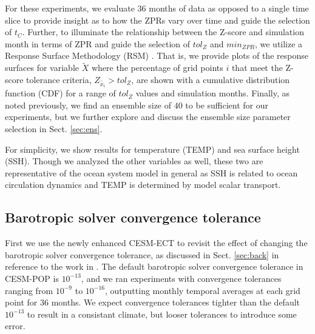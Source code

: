 \documentclass[gmd, manuscript]{copernicus}
\begin{document}
For these experiments, we evaluate 36 months of data as opposed to a single time slice to provide insight as to how the ZPRs vary over time and guide the selection of $t_C$.  Further, to illuminate the relationship between the Z-score and simulation month in terms of ZPR and guide the selection of $tol_{Z}$ and $min_{ZPR}$, we utilize a Response Surface Methodology (RSM) \citep[e.g.,][]{box2007}. That is, we provide plots of the response surfaces for variable $\tilde{X}$ where the percentage of grid points $i$ that meet the Z-score tolerance criteria, $Z_{\tilde{x_i}} > tol_{Z}$, are shown with a cumulative distribution function (CDF) for a range of $tol_{Z}$ values and simulation months. Finally, as noted previously, we find an ensemble size of $40$ to be sufficient for our experiments, but we further explore and discuss the ensemble size parameter selection in Sect. \ref{sec:ens}.

For simplicity, we show results for temperature (TEMP) and sea surface height (SSH).  Though we analyzed the other variables as well, these two are representative of the ocean system model in general as SSH is related to ocean circulation dynamics and TEMP is determined by model scalar transport. 

\subsection{Barotropic solver convergence tolerance}

First we use the newly enhanced CESM-ECT to revisit the effect of changing the barotropic solver convergence tolerance, as discussed in Sect. \ref{sec:back} in reference to the work in \cite{yong2015}. The default barotropic solver convergence tolerance in CESM-POP is $10^{-13}$, and we ran experiments with convergence tolerances ranging from  $10^{-9}$ to $10^{-16}$, outputting monthly temporal averages at each grid point for 36 months.  
We expect convergence tolerances tighter than the default $10^{-13}$ to result in a consistant climate, but looser tolerances to introduce some error.
\end{document}
